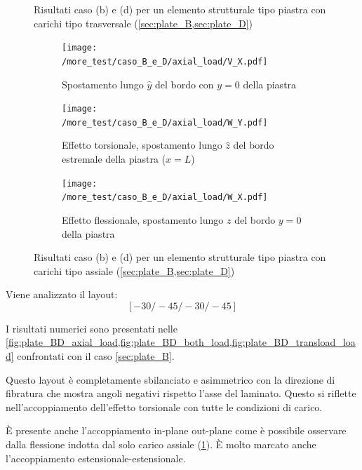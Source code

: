 \documentclass[a4paper,num-refs]{oup-contemporary}
\begin{document}
\begin{figure}[bt!]
\begin{subfigure}[t]{0.3\textwidth}
	\end{subfigure}
	\hfill
	\caption{Risultati caso (b) e (d) per un elemento strutturale tipo piastra con carichi tipo trasversale (\cref{sec:plate_B,sec:plate_D})}
	\label{fig:plate_BD_transload_load}

	\centering
	
	\begin{subfigure}[t]{0.3\textwidth}
		\centering
		\texttt{[image: /more\_test/caso\_B\_e\_D/axial\_load/V\_X.pdf]}
		\caption{Spostamento lungo $\hat y$ del bordo con $y=0$ della piastra}
		
	\end{subfigure}
	\hfill
	\begin{subfigure}[t]{0.3\textwidth}
		\centering
		\texttt{[image: /more\_test/caso\_B\_e\_D/axial\_load/W\_Y.pdf]}
		
		\caption{Effetto torsionale, spostamento lungo $\hat z$ del bordo estremale della piastra ($x=L$)}
		
	\end{subfigure}
	\hfill
	\begin{subfigure}[t]{0.3\textwidth}
		\centering
		\texttt{[image: /more\_test/caso\_B\_e\_D/axial\_load/W\_X.pdf]}
		\caption{Effetto flessionale, spostamento lungo $z$ del bordo $y=0$ della piastra}
		\label{fig:plate_BD_extra}
	\end{subfigure}
	\hfill
	\caption{Risultati caso (b) e (d) per un elemento strutturale tipo piastra con carichi tipo assiale (\cref{sec:plate_B,sec:plate_D})}
	\label{fig:plate_BD_axial_load}
\end{figure}

Viene analizzato il layout:
\begin{equation}
\left[-30 /-45 /-30 /-45\right]
\end{equation}

I risultati numerici sono presentati nelle \cref{fig:plate_BD_axial_load,fig:plate_BD_both_load,fig:plate_BD_transload_load} confrontati con il caso \cref{sec:plate_B}.  

Questo layout è completamente sbilanciato e asimmetrico con la direzione di fibratura che mostra angoli negativi rispetto l'asse del laminato. Questo si riflette nell'accoppiamento dell'effetto torsionale con tutte le condizioni di carico. 

È presente anche l'accoppiamento in-plane out-plane come è possibile osservare dalla flessione indotta dal solo carico assiale (\cref{fig:plate_BD_extra}).  È molto marcato anche l'accoppiamento estensionale-estensionale. 
\end{document}
